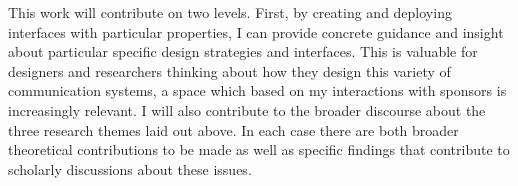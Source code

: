 This work will contribute on two levels. First, by creating and deploying interfaces with particular properties, I can provide concrete guidance and insight about particular specific design strategies and interfaces. This is valuable for designers and researchers thinking about how they design this variety of communication systems, a space which based on my interactions with sponsors is increasingly relevant. I will also contribute to the broader discourse about the three research themes laid out above. In each case there are both broader theoretical contributions to be made as well as specific findings that contribute to scholarly discussions about these issues.









